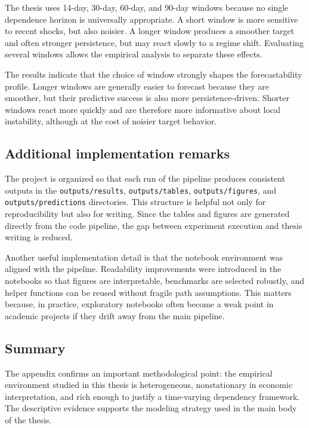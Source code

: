 The thesis uses 14-day, 30-day, 60-day, and 90-day windows because no single dependence horizon is universally appropriate. A short window is more sensitive to recent shocks, but also noisier. A longer window produces a smoother target and often stronger persistence, but may react slowly to a regime shift. Evaluating several windows allows the empirical analysis to separate these effects.

The results indicate that the choice of window strongly shapes the forecastability profile. Longer windows are generally easier to forecast because they are smoother, but their predictive success is also more persistence-driven. Shorter windows react more quickly and are therefore more informative about local instability, although at the cost of noisier target behavior.

\subsection{Additional implementation remarks}

The project is organized so that each run of the pipeline produces consistent outputs in the \texttt{outputs/results}, \texttt{outputs/tables}, \texttt{outputs/figures}, and \texttt{outputs/predictions} directories. This structure is helpful not only for reproducibility but also for writing. Since the tables and figures are generated directly from the code pipeline, the gap between experiment execution and thesis writing is reduced.

Another useful implementation detail is that the notebook environment was aligned with the pipeline. Readability improvements were introduced in the notebooks so that figures are interpretable, benchmarks are selected robustly, and helper functions can be reused without fragile path assumptions. This matters because, in practice, exploratory notebooks often become a weak point in academic projects if they drift away from the main pipeline.

\subsection{Summary}

The appendix confirms an important methodological point: the empirical environment studied in this thesis is heterogeneous, nonstationary in economic interpretation, and rich enough to justify a time-varying dependency framework. The descriptive evidence supports the modeling strategy used in the main body of the thesis.
